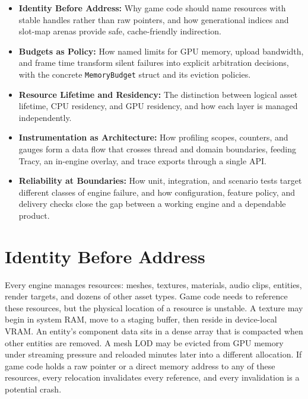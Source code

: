 \documentclass[
  11pt,
  letterpaper,
  DIV=11,
  numbers=noendperiod,
  twoside,
  open=right]{scrreprt}
\providecommand{\tightlist}{%
  \setlength{\itemsep}{0pt}\setlength{\parskip}{0pt}}
\begin{document}

\begin{itemize}
\tightlist
\item
  \textbf{Identity Before Address:} Why game code should name resources
  with stable handles rather than raw pointers, and how generational
  indices and slot-map arenas provide safe, cache-friendly indirection.
\item
  \textbf{Budgets as Policy:} How named limits for GPU memory, upload
  bandwidth, and frame time transform silent failures into explicit
  arbitration decisions, with the concrete \texttt{MemoryBudget} struct
  and its eviction policies.
\item
  \textbf{Resource Lifetime and Residency:} The distinction between
  logical asset lifetime, CPU residency, and GPU residency, and how each
  layer is managed independently.
\item
  \textbf{Instrumentation as Architecture:} How profiling scopes,
  counters, and gauges form a data flow that crosses thread and domain
  boundaries, feeding Tracy, an in-engine overlay, and trace exports
  through a single API.
\item
  \textbf{Reliability at Boundaries:} How unit, integration, and
  scenario tests target different classes of engine failure, and how
  configuration, feature policy, and delivery checks close the gap
  between a working engine and a dependable product.
\end{itemize}

\section{Identity Before Address}\label{sec-identity}

Every engine manages resources: meshes, textures, materials, audio
clips, entities, render targets, and dozens of other asset types. Game
code needs to reference these resources, but the physical location of a
resource is unstable. A texture may begin in system RAM, move to a
staging buffer, then reside in device-local VRAM. An entity's component
data sits in a dense array that is compacted when other entities are
removed. A mesh LOD may be evicted from GPU memory under streaming
pressure and reloaded minutes later into a different allocation. If game
code holds a raw pointer or a direct memory address to any of these
resources, every relocation invalidates every reference, and every
invalidation is a potential crash.
\end{document}
